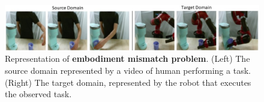 \begin{figure}[t]
    
    \includegraphics[width=\textwidth]{figures/images/embodiment_mismatch/embo.jpg}
    \caption{Representation of \textbf{embodiment mismatch problem}. (Left) The source domain
    represented by a video of human performing a task. (Right) The target domain, represented
    by the robot that executes the observed task.}
    \label{fig:embo_mismatch}
    
\end{figure}
